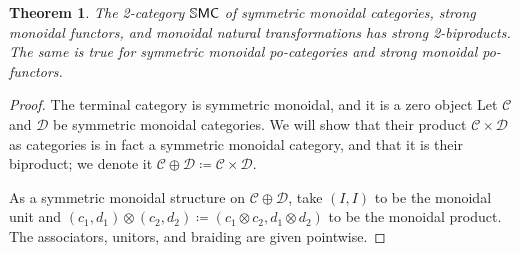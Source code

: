\documentclass[11pt, oneside, article]{memoir}
\theoremstyle{plain}
\newtheorem{theorem}{Theorem}[chapter] %
\theoremstyle{definition}
\theoremstyle{remark}
\newcommand{\cat}[1]{\mathcal{#1}}%
\newcommand{\Cat}[1]{{\mathsf{#1}}}%
\newcommand{\CCat}[1]{\mathbb{\StrLeft{#1}{1}}\Cat{\StrGobbleLeft{#1}{1}}}%
\newcommand{\ssmc}{\CCat{SMC}}
\begin{document}
\begin{theorem}
The 2-category $\ssmc$ of symmetric monoidal categories, strong monoidal functors, and monoidal natural transformations has strong 2-biproducts. The same is true for symmetric monoidal po-categories and strong monoidal po-functors.
\end{theorem}
\begin{proof}
The terminal category is symmetric monoidal, and it is a zero object
Let $\cat{C}$ and $\cat{D}$ be symmetric monoidal categories. We will show that their product $\cat{C}\times\cat{D}$ as categories is in fact a symmetric monoidal category, and that it is their biproduct; we denote it $\cat{C}\oplus\cat{D}\coloneqq\cat{C}\times\cat{D}$.

As a symmetric monoidal structure on $\cat{C}\oplus\cat{D}$, take $(I,I)$ to be the monoidal unit and $(c_1,d_1)\otimes(c_2,d_2)\coloneqq(c_1\otimes c_2,d_1\otimes d_2)$ to be the monoidal product. The associators, unitors, and braiding are given pointwise.


\end{proof}
\end{document}
